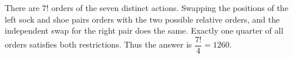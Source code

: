 There are $7!$ orders of the seven distinct actions. Swapping the positions of the left sock and shoe pairs orders with the two possible relative orders, and the independent swap for the right pair does the same. Exactly one quarter of all orders satisfies both restrictions. Thus the answer is $\boxed{\dfrac{7!}{4}=1260}$.
